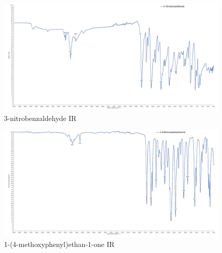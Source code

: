 \documentclass[12pt]{article}
\begin{document}
\newpage
\begin{figure}[H]
    \centering
    \includegraphics[scale=0.234]{spectra/ir4.1.png}
    \caption{3-nitrobenzaldehyde IR}
\end{figure}
\begin{figure}[H]
    \centering
    \includegraphics[scale=0.234]{spectra/ir5.1.png}
    \caption{1-(4-methoxyphenyl)ethan-1-one IR}
\end{figure}
\end{document}
